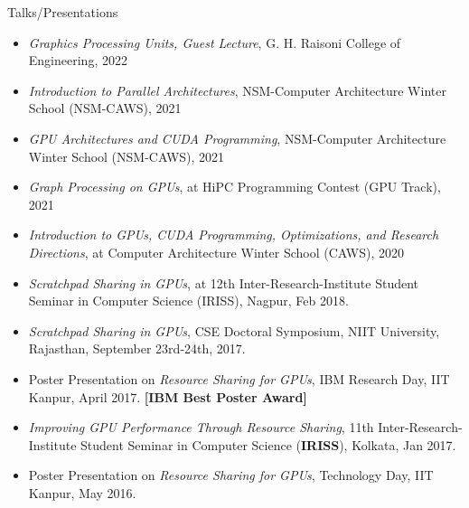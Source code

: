 \documentclass{resume} %
\begin{document}
\begin{rSection}{Talks/Presentations}
\begin{itemize}
\item \textit{Graphics Processing Units, Guest Lecture}, G. H. Raisoni College of Engineering, 2022
\item \textit{Introduction to Parallel Architectures}, NSM-Computer Architecture Winter School (NSM-CAWS), 2021
\item \textit{GPU Architectures and CUDA Programming}, NSM-Computer Architecture Winter School (NSM-CAWS), 2021	
\item \textit{Graph Processing on GPUs}, at HiPC Programming Contest (GPU Track), 2021
\item \textit{Introduction to GPUs, CUDA Programming, Optimizations, and Research Directions}, at Computer Architecture Winter School (CAWS), 2020
\item \textit{Scratchpad Sharing in GPUs}, at 12th Inter-Research-Institute Student Seminar in Computer Science (IRISS), Nagpur, Feb 2018. 
\item \textit{Scratchpad Sharing in GPUs}, CSE Doctoral Symposium, NIIT University, Rajasthan, September 23rd-24th, 2017.
\item Poster Presentation on \textit{Resource Sharing for GPUs}, IBM Research Day, IIT Kanpur, April 2017. \textbf{[IBM Best Poster Award]} 
\item \textit{Improving GPU Performance Through Resource Sharing}, 11th Inter-Research-Institute Student Seminar in Computer Science (\textbf{IRISS}), Kolkata, Jan 2017.
\item Poster Presentation on \textit{Resource Sharing for GPUs}, Technology Day, IIT Kanpur, May 2016. 

\end{itemize}
\end{rSection}


\end{document}
